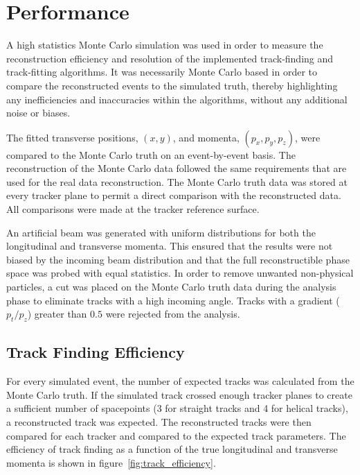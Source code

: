 \section{Performance}
\label{sec:Performance}

  A high statistics Monte Carlo simulation was used in order to measure the reconstruction efficiency and resolution of the implemented track-finding and track-fitting algorithms. It was necessarily Monte Carlo based in order to compare the reconstructed events to the simulated truth, thereby highlighting any inefficiencies and inaccuracies within the algorithms, without any additional noise or biases.

  The fitted transverse positions, $(x,y)$, and momenta, $(p_x, p_y, p_z)$, were compared to the Monte Carlo truth on an event-by-event basis. The reconstruction of the Monte Carlo data followed the same requirements that are used for the real data reconstruction. The Monte Carlo truth data was stored at every tracker plane to permit a direct comparison with the reconstructed data. All comparisons were made at the tracker reference surface. %

  An artificial beam was generated with uniform distributions for both the longitudinal and transverse momenta. This ensured that the results were not biased by the incoming beam distribution and that the full reconstructible phase space was probed with equal statistics. In order to remove unwanted non-physical particles, a cut was placed on the Monte Carlo truth data during the analysis phase to eliminate tracks with a high incoming angle. Tracks with a gradient ($p_t/p_z$) greater than $0.5$ were rejected from the analysis.

  \subsection{Track Finding Efficiency}
  \label{sec:performance:track_finding}

  For every simulated event, the number of expected tracks was calculated from the Monte Carlo truth. If the simulated track crossed enough tracker planes to create a sufficient number of spacepoints (3 for straight tracks and 4 for helical tracks), a reconstructed track was expected. The reconstructed tracks were then compared for each tracker and compared to the expected track parameters. The efficiency of track finding as a function of the true longitudinal and transverse momenta is shown in figure~\ref{fig:track_efficiency}.

